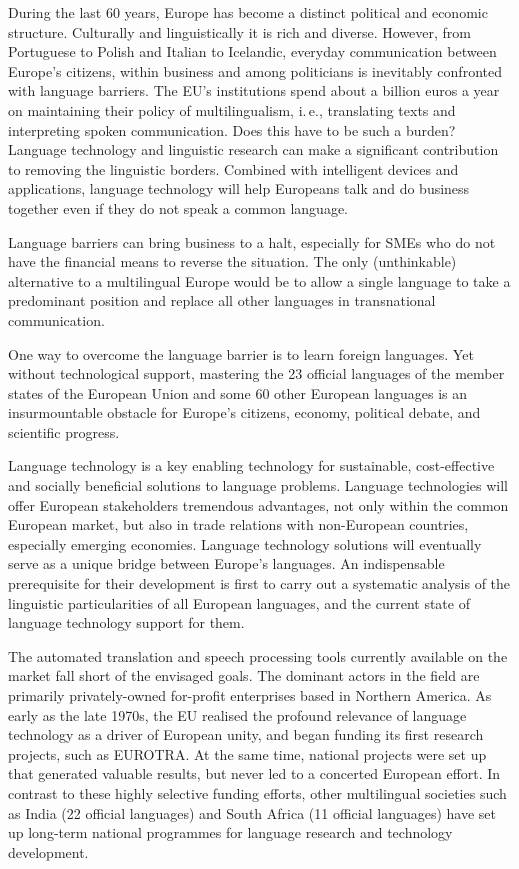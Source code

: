 \begin{multicols}{2}

During the last 60 years, Europe has become a distinct political and economic structure. Culturally and linguistically it is rich and diverse. However, from Portuguese to Polish and Italian to Icelandic, everyday communication between Europe’s citizens, within business and among politicians is inevitably confronted with language barriers. The EU's institutions spend about a billion euros a year on maintaining their policy of multilingualism, i.\,e., translating texts and interpreting spoken communication. Does this have to be such a burden? Language technology and linguistic research can make a significant contribution to removing the linguistic borders. Combined with intelligent devices and applications, language technology will help Europeans talk and do business together even if they do not speak a common language. 


Language barriers can bring business to a halt, especially for SMEs who do not have the financial means to reverse the situation. The only (unthinkable) alternative to a multilingual Europe would be to allow a single language to take a predominant position and replace all other languages in transnational communication. 

One way to overcome the language barrier is to learn foreign languages. Yet without technological support, mastering the 23 official languages of the member states of the European Union and some 60 other European languages is an insurmountable obstacle for Europe’s citizens, economy, political debate, and scientific progress. 

Language technology is a key enabling technology for sustainable, cost-effective and socially beneficial solutions to language problems. Language technologies will offer European stakeholders tremendous advantages, not only within the common European market, but also in trade relations with non-European countries, especially emerging economies. Language technology solutions will eventually serve as a unique bridge between Europe's languages. An indispensable prerequisite for their development is first to carry out a systematic analysis of the linguistic particularities of all European languages, and the current state of language technology support for them.  
    
The automated translation and speech processing tools currently available on the market fall short of the envisaged goals. The dominant actors in the field are primarily privately-owned for-profit enterprises based in Northern America.
As early as the late 1970s, the EU realised the profound relevance of language technology as a driver of European unity, and began funding its first research projects, such as EUROTRA. At the same time, national projects were set up that generated valuable results, but never led to a concerted European effort. In contrast to these highly selective funding efforts, other multilingual societies such as India (22 official languages) and South Africa (11 official languages) have set up long-term national programmes for language research and technology development. 


\end{multicols}
